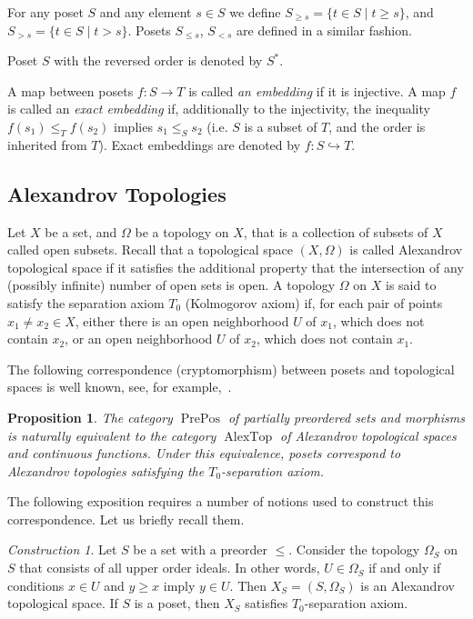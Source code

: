 \documentclass[english,12pt,oneside]{amsproc}
\DeclareMathOperator{\PrePos}{PrePos}
\DeclareMathOperator{\AlexTop}{AlexTop}
\newcounter{stmcounter}[section]
\numberwithin{equation}{section}
\theoremstyle{plain}
\newtheorem{prop}[stmcounter]{Proposition}
\theoremstyle{definition}
\theoremstyle{remark}
\newtheorem{con}[stmcounter]{Construction}
\begin{document}
For any poset $S$  and  any element $s\in S$ we define $S_{\geqslant s}=\{t\in S\mid t\geqslant s\}$, and $S_{>s}=\{t\in S\mid t>s\}$. Posets $S_{\leqslant s}$, $S_{<s}$ are defined in a similar fashion.

Poset $S$ with the reversed order is denoted by $S^*$.

A map between posets $f\colon S\to T$ is called \emph{an embedding} if it is injective. A map $f$ is called an \emph{exact embedding} if, additionally to the injectivity, the inequality $f(s_1)\leqslant_T f(s_2)$ implies $s_1\leqslant_Ss_2$ (i.e. $S$ is a subset of $T$, and the order is inherited from $T$). Exact embeddings are denoted by $f\colon S\hookrightarrow T$.

\subsection{Alexandrov Topologies}\label{AT}

Let $X$ be a set, and $\Omega$ be a topology on $X$, that is a collection of subsets of $X$ called open subsets. Recall that a topological space $(X,\Omega)$ is called Alexandrov topological space if it satisfies the additional property that the intersection of any (possibly infinite) number of open sets is open. A topology $\Omega$ on $X$ is said to satisfy the separation axiom $T_0$ (Kolmogorov axiom) if, for each pair of points $x_1\neq x_2\in X$, either there is an open neighborhood $U$ of $x_1$, which does not contain $x_2$, or an open neighborhood $U$ of $x_2$, which does not contain $x_1$.

The following correspondence (cryptomorphism) between posets and topological spaces is well known, see, for example,~\cite{Arenas}.

\begin{prop}\label{propPosTop}
The category $\PrePos$ of partially preordered sets and morphisms is naturally equivalent to the category $\AlexTop$ of Alexandrov topological spaces and continuous functions. Under this equivalence, posets correspond to Alexandrov topologies satisfying the $T_0$-separation axiom.
\end{prop}

The following exposition requires a number of notions used to construct this correspondence. Let us briefly recall them.

\begin{con}\label{conPrePosToSpace}
Let $S$ be a set with a preorder $\leqslant$. Consider the topology $\Omega_S$ on $S$ that consists of all upper order ideals. In other words, $U\in \Omega_S$ if and only if conditions $x\in U$ and $y\geqslant x$ imply $y\in U$. Then $X_S=(S,\Omega_S)$ is an Alexandrov topological space. If $S$ is a poset, then $X_S$ satisfies $T_0$-separation axiom.
\end{con}
\end{document}
